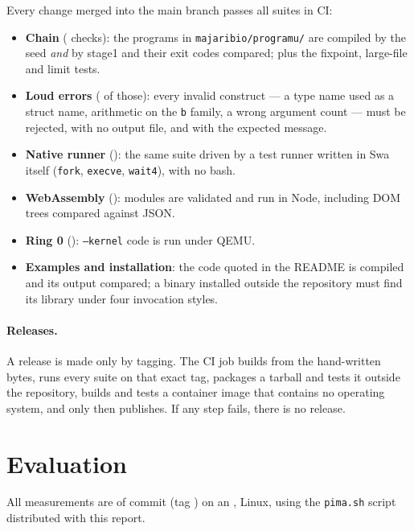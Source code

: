 \documentclass[11pt,a4paper]{article}
\begin{document}
Every change merged into the main branch passes all suites in CI:

\begin{itemize}
  \item \textbf{Chain} (\MnyororoJumla{} checks): the \MajaribioProgramu{} programs in \texttt{majaribio/programu/} are compiled by the seed \emph{and} by stage1 and their exit codes compared; plus the fixpoint, large-file and limit tests.
  \item \textbf{Loud errors} (\MajaribioKata{} of those): every invalid construct --- a type name used as a struct name, arithmetic on the \texttt{b} family, a wrong argument count --- must be rejected, with no output file, and with the expected message.
  \item \textbf{Native runner} (\AsiliJumla): the same suite driven by a test runner written in Swa itself (\texttt{fork}, \texttt{execve}, \texttt{wait4}), with no bash.
  \item \textbf{WebAssembly} (\WasmJumla): modules are validated and run in Node, including DOM trees compared against JSON.
  \item \textbf{Ring 0} (\KernelJumla): \texttt{--kernel} code is run under QEMU.
  \item \textbf{Examples and installation}: the code quoted in the README is compiled and its output compared; a binary installed outside the repository must find its library under four invocation styles.
\end{itemize}

\paragraph{Releases.} A release is made only by tagging. The CI job builds from the hand-written bytes, runs every suite on that exact tag, packages a tarball and tests it outside the repository, builds and tests a container image that contains no operating system, and only then publishes. If any step fails, there is no release.

\section{Evaluation}\label{sec:tathmini}

All measurements are of commit \Commit{} (tag \Toleo) on an \Cpu, Linux, using the \texttt{pima.sh} script distributed with this report.
\end{document}
